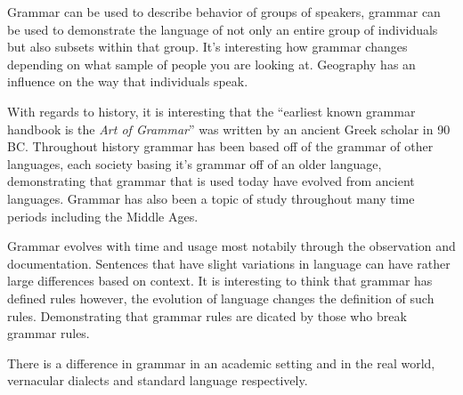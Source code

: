 \documentclass{article}
\begin{document}
\medskip

Grammar can be used to describe behavior of groups of speakers, grammar can be used to demonstrate the language of not only an
entire group of individuals but also subsets within that group. It's interesting how grammar changes depending on what sample 
of people you are looking at. Geography has an influence on the way that individuals speak.

With regards to history, it is interesting that the ``earliest known grammar handbook is the \textit{Art of Grammar}'' was written
by an ancient Greek scholar in 90 BC. Throughout history grammar has been based off of the grammar of other languages, each society
basing it's grammar off of an older language, demonstrating that grammar that is used today have evolved from ancient languages.
Grammar has also been a topic of study throughout many time periods including the Middle Ages.

Grammar evolves with time and usage most notabily through the observation and documentation. Sentences that have slight variations in
language can have rather large differences based on context. It is interesting to think that grammar has defined rules however, the 
evolution of language changes the definition of such rules. Demonstrating that grammar rules are dicated by those who break grammar 
rules. 

There is a difference in grammar in an academic setting and in the real world, vernacular dialects and standard language respectively.
\end{document}
